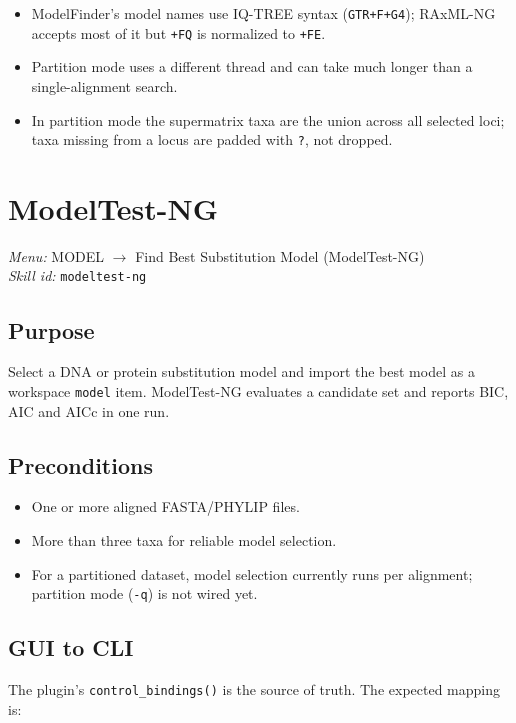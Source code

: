 \documentclass[11pt]{report}
\begin{document}
\begin{itemize}
  \item ModelFinder's model names use IQ-TREE syntax (\texttt{GTR+F+G4}); RAxML-NG accepts most of it but \texttt{+FQ} is normalized to \texttt{+FE}.
  \item Partition mode uses a different thread and can take much longer than a single-alignment search.
  \item In partition mode the supermatrix taxa are the union across all selected loci; taxa missing from a locus are padded with \texttt{?}, not dropped.
\end{itemize}


\section{ModelTest-NG}
\noindent\textit{Menu:} MODEL $\rightarrow$ Find Best Substitution Model (ModelTest-NG)\\
\noindent\textit{Skill id:} \texttt{modeltest-ng}

\subsection{Purpose}

Select a DNA or protein substitution model and import the best model as a workspace \texttt{model} item. ModelTest-NG evaluates a candidate set and reports BIC, AIC and AICc in one run.

\subsection{Preconditions}

\begin{itemize}
  \item One or more aligned FASTA/PHYLIP files.
  \item More than three taxa for reliable model selection.
  \item For a partitioned dataset, model selection currently runs per alignment; partition mode (\texttt{-q}) is not wired yet.
\end{itemize}

\subsection{GUI to CLI}

The plugin's \texttt{control\_\allowbreak bindings\allowbreak ()} is the source of truth. The expected mapping is:
\end{document}
